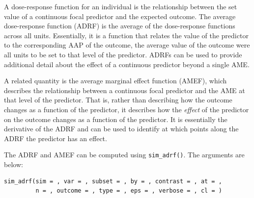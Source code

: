 A dose-response function for an individual is the relationship between the set value of a continuous focal predictor and the expected outcome. The average dose-response function (ADRF) is the average of the dose-response functions across all units. Essentially, it is a function that relates the value of the predictor to the corresponding AAP of the outcome, the average value of the outcome were all units to be set to that level of the predictor. ADRFs can be used to provide additional detail about the effect of a continuous predictor beyond a single AME.

A related quantity is the average marginal effect function (AMEF), which describes the relationship between a continuous focal predictor and the AME at that level of the predictor. That is, rather than describing how the outcome changes as a function of the predictor, it describes how the \emph{effect} of the predictor on the outcome changes as a function of the predictor. It is essentially the derivative of the ADRF and can be used to identify at which points along the ADRF the predictor has an effect.

The ADRF and AMEF can be computed using \texttt{sim\_adrf()}. The arguments are below:

\begin{verbatim}
sim_adrf(sim = , var = , subset = , by = , contrast = , at = ,
         n = , outcome = , type = , eps = , verbose = , cl = )
\end{verbatim}

